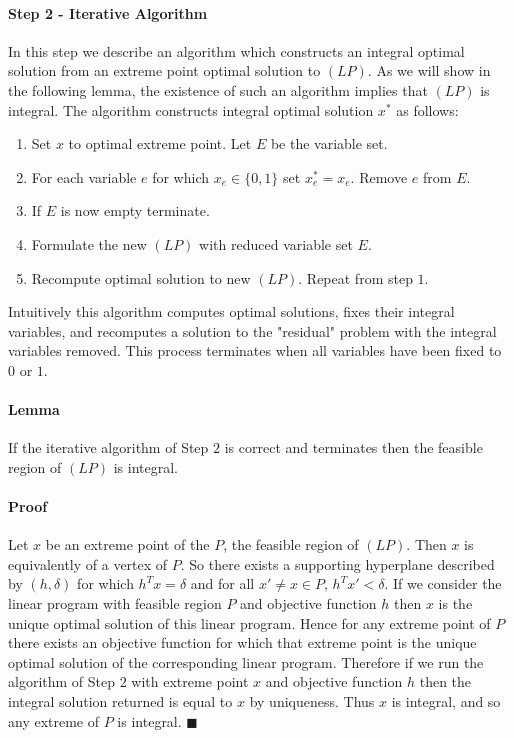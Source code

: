 \paragraph{Step 2 - Iterative Algorithm}
In this step we describe an algorithm which constructs an integral optimal solution from an extreme point optimal solution to $(LP)$. As we will show in the following lemma, the existence of such an algorithm implies that $(LP)$ is integral. The algorithm constructs integral optimal solution $x^*$ as follows:
\begin{enumerate}
\item Set $x$ to optimal extreme point. Let $E$ be the variable set.
\item For each variable $e$ for which $x_e  \in \{0,1\}$ set $x^*_e = x_e$. Remove $e$ from $E$.
\item If $E$ is now empty terminate.
\item Formulate the new $(LP)$ with reduced variable set $E$.
\item Recompute optimal solution to new $(LP)$. Repeat from step $1$.
\end{enumerate}
Intuitively this algorithm computes optimal solutions, fixes their integral variables, and recomputes a solution to the "residual" problem with the integral variables removed. This process terminates when all variables have been fixed to $0$ or $1$.
\paragraph{Lemma} If the iterative algorithm of Step $2$ is correct and terminates then the feasible region of $(LP)$ is integral.
\paragraph{Proof}
Let $x$ be an extreme point of the $P$, the feasible region of $(LP)$. Then $x$ is equivalently of a vertex of $P$. So there exists a supporting hyperplane described by $(h,\delta)$ for which $h^Tx = \delta$ and for all $x' \neq x \in P$, $h^Tx' < \delta$. If we consider the linear program with feasible region $P$ and objective function $h$ then $x$ is the unique optimal solution of this linear program. Hence for any extreme point of $P$ there exists an objective function for which that extreme point is the unique optimal solution of the corresponding linear program. Therefore if we run the algorithm of Step $2$ with extreme point $x$ and objective function $h$ then the integral solution returned is equal to $x$ by uniqueness. Thus $x$ is integral, and so any extreme of $P$ is integral. $\blacksquare$
